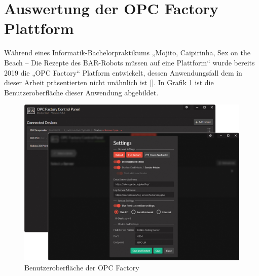 \section{Auswertung der OPC Factory Plattform}
\label{sec:OPCFactory}

Während eines Informatik-Bachelorpraktikums „Mojito, Caipirinha, Sex on the Beach – Die Rezepte des BAR-Robots müssen auf eine Plattform“ wurde bereits 2019 die „OPC Factory“ Platform entwickelt, dessen Anwendungsfall dem in dieser Arbeit präsentierten nicht unähnlich ist [\cite{bp}]. In Grafik \ref{fig:OPCFactoryBenutzeroberfläche} ist die Benutzeroberfläche dieser Anwendung abgebildet.
%
\begin{figure}[htbp]
	\centering\includegraphics[width=1.0\textwidth]{images/04/OPC_Factory.jpg}
    \caption{Benutzeroberfläche der OPC Factory}
    \label{fig:OPCFactoryBenutzeroberfläche}
\end{figure}

